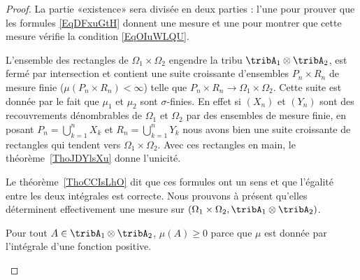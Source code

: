 	\begin{proof}
	La partie «existence» sera divisée en deux parties : l'une pour prouver que les formules \eqref{EqDFxuGtH} donnent une mesure et une pour montrer que cette mesure vérifie la condition \eqref{EqOIuWLQU}.
	\begin{subproof}
	\spitem[Unicité]

	L'ensemble des rectangles de \( \Omega_1\times \Omega_2\) engendre la tribu \( \tribA_1\otimes\tribA_2\), est fermé par intersection et contient une suite croissante d'ensembles \( P_n\times R_n\) de mesure finie (\( \mu(P_n\times R_n)<\infty\)) telle que \( P_n\times R_n\to \Omega_1\times \Omega_2\). Cette suite est donnée par le fait que \( \mu_1\) et \( \mu_2\) sont \( \sigma\)-finies. En effet si \( (X_n)\) et \( (Y_n)\) sont des recouvrements dénombrables de \( \Omega_1\) et \( \Omega_2\) par des ensembles de mesure finie, en posant \( P_n=\bigcup_{k=1}^nX_k\) et \( R_n=\bigcup_{k=1}^nY_k\) nous avons bien une suite croissante de rectangles qui tendent vers \( \Omega_1\times \Omega_2\). Avec ces rectangles en main, le théorème~\ref{ThoJDYlsXu} donne l'unicité.

	Le théorème~\ref{ThoCCIsLhO} dit que ces formules ont un sens et que l'égalité entre les deux intégrales est correcte. Nous prouvons à présent qu'elles déterminent effectivement une mesure sur \( (\Omega_1\times\Omega_2,\tribA_1\otimes \tribA_2)\).

	Pour tout \( A\in \tribA_1\otimes \tribA_2\), \( \mu(A)\geq 0\) parce que \( \mu\) est donnée par l'intégrale d'une fonction positive.


\end{subproof}
\end{proof}
